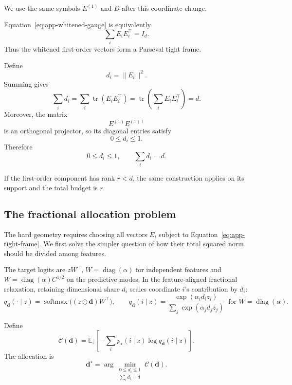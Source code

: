 We use the same symbols \(E^{(1)}\) and \(D\) after this coordinate change.

Equation~\eqref{eq:app-whitened-gauge} is equivalently
\begin{equation}
\boxed{
\sum_iE_iE_i^\top=I_d.
}
\label{eq:app-tight-frame}
\end{equation}
Thus the whitened first-order vectors form a Parseval tight frame.

Define
\begin{equation}
\boxed{
d_i=\|E_i\|^2.
}
\label{eq:app-di}
\end{equation}
Summing gives
\[
\sum_i d_i
=
\sum_i\operatorname{tr}(E_iE_i^\top)
=
\operatorname{tr}
\left(
\sum_iE_iE_i^\top
\right)
=
d.
\]
Moreover, the matrix
\[
E^{(1)}E^{(1)\top}
\]
is an orthogonal projector, so its diagonal entries satisfy
\[
0\le d_i\le1.
\]
Therefore
\begin{equation}
\boxed{
0\le d_i\le1,
\qquad
\sum_i d_i=d.
}
\label{eq:app-dimensional-budget}
\end{equation}

If the first-order component has rank \(r<d\), the same construction applies on its
support and the total budget is \(r\).

\subsection{The fractional allocation problem}

The hard geometry requires choosing all vectors \(E_i\) subject to
Equation~\eqref{eq:app-tight-frame}. We first solve the simpler question of how their
total squared norm should be divided among features.

The target logits are \(zW^\top\), \(W=\operatorname{diag}(\alpha)\) for independent
features and \(W=\operatorname{diag}(\alpha)C^{1/2}\) on the predictive modes. In the
feature-aligned fractional relaxation, retaining dimensional share \(d_i\) scales
coordinate \(i\)'s contribution by \(d_i\):
\begin{equation}
q_{\mathbf d}(\cdot\mid z)
=
\operatorname{softmax}\!\big((z\odot\mathbf d)W^\top\big),
\qquad
q_{\mathbf d}(i\mid z)
=
\frac{\exp(\alpha_i d_i z_i)}
{\sum_j\exp(\alpha_jd_jz_j)}
\ \text{ for } W=\operatorname{diag}(\alpha).
\label{eq:app-fractional-predictor}
\end{equation}

Define
\begin{equation}
\mathcal C(\mathbf d)
=
\mathbb E_z
\left[
-\sum_i
p_\star(i\mid z)
\log q_{\mathbf d}(i\mid z)
\right].
\label{eq:app-allocation-loss}
\end{equation}
The allocation is
\begin{equation}
\boxed{
\mathbf d^\star
=
\arg\min_{\substack{0\le d_i\le1\\ \sum_i d_i=d}}
\mathcal C(\mathbf d).
}
\label{eq:app-allocation-program}
\end{equation}

